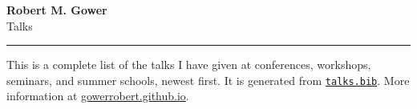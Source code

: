 \documentclass[10pt,letterpaper]{article}
\begin{document}
{\Huge\bfseries Robert M. Gower}\\[0.4em]
{\Large\color{muted}Talks}\\[0.65em]
{\color{rule}\hrule}
\vspace{0.7em}

This is a complete list of the talks I have given at conferences, workshops, seminars, and summer schools, newest first. It is generated from \href{https://github.com/gowerrobert/gowerrobert.github.io/blob/master/talks.bib}{\texttt{talks.bib}}. More information at \href{https://gowerrobert.github.io}{gowerrobert.github.io}.

\nocite{*}

\printbibliography[env=talklist,keyword=upcoming,title={Upcoming}]
\printbibliography[env=talklist,notkeyword=upcoming,title={Past Talks}]
\end{document}
